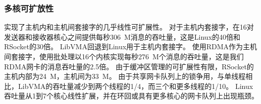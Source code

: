 \subsubsection{多核可扩放性}





\sys 实现了主机内和主机间套接字的几乎线性可扩展性。
对于主机内套接字，\sys 在16对发送器和接收器核心之间提供每秒306~M消息的吞吐量，这是Linux的40倍和RSocket的30倍。
LibVMA回退到Linux用于主机内套接字。
使用RDMA作为主机间套接字，\sys 使用批处理以16个内核实现每秒276~M个消息的吞吐量，这是我们RDMA网卡的消息吞吐量的2.5倍。
由于缓冲区管理的可扩展性有限，RSocket的主机内部为24~M，主机间为33~M。
由于共享网卡队列上的锁争用，与单线程相比，LibVMA的吞吐量减少到两个线程的1/4，而三个和更多线程的1/10。
Linux吞吐量从1到7个核心线性扩展，并在环回或具有更多核心的网卡队列上出现瓶颈。



